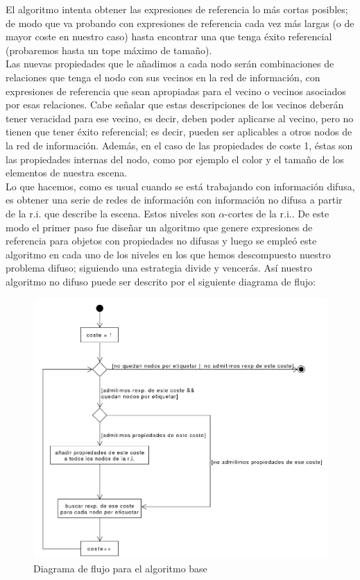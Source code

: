 \documentclass[10pt,a4paper]{article}
\begin{document}
El algoritmo intenta obtener las expresiones de referencia lo más cortas posibles; de modo que va probando con expresiones de referencia cada vez más largas (o de mayor coste en nuestro caso) hasta encontrar una que tenga éxito referencial (probaremos hasta un tope máximo de tamaño).\\

Las nuevas propiedades que le añadimos a cada nodo serán combinaciones de relaciones que tenga el nodo con sus vecinos en la red de información, con expresiones de referencia que sean apropiadas para el vecino o vecinos asociados por esas relaciones. Cabe señalar que estas descripciones de los vecinos deberán tener veracidad para ese vecino, es decir, deben poder aplicarse al vecino, pero no tienen que tener éxito referencial; es decir, pueden ser aplicables a otros nodos de la red de información. Además, en el caso de las propiedades de coste 1, éstas son las propiedades internas del nodo, como por ejemplo el color y el tamaño de los elementos de nuestra escena.\\

Lo que hacemos, como es usual cuando se está trabajando con información difusa, es obtener una serie de redes de información con información no difusa a partir de la r.i. que describe la escena. Estos niveles son $\alpha$-cortes de la r.i.. De este modo el primer paso fue diseñar un algoritmo que genere expresiones de referencia para objetos con propiedades no difusas y luego se empleó este algoritmo en cada uno de los niveles en los que hemos descompuesto nuestro problema difuso; siguiendo una estrategia divide y vencerás. Así nuestro algoritmo no difuso puede ser descrito por el siguiente diagrama de flujo:

\begin{figure}[H]
\centering
\includegraphics[scale=0.5]{img/diagramaFlujoAlgCrisp.png}
\caption{Diagrama de flujo para el algoritmo base}
\end{figure}
\end{document}
